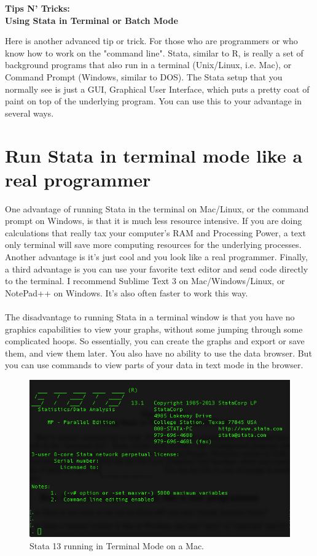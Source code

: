 \documentclass[11pt]{article}
\begin{document}
\thispagestyle{empty}
\pagestyle{plain}
%
\begin{center}
{\bf Tips N' Tricks: \\ 
Using Stata in Terminal or Batch Mode}
\end{center}

\noindent Here is another advanced tip or trick. For those who are programmers or who know how to work on the "command line". Stata, similar to R, is really a set of background programs that also run in a terminal (Unix/Linux, i.e. Mac), or Command Prompt (Windows, similar to DOS). The Stata setup that you normally see is just a GUI, Graphical User Interface, which puts a pretty coat of paint on top of the underlying program. You can use this to your advantage in several ways.

\section{Run Stata in terminal mode like a real programmer}

\noindent One advantage of running Stata in the terminal on Mac/Linux, or the command prompt on Windows, is that it is much less resource intensive. If you are doing calculations that really tax your computer's RAM and Processing Power, a text only terminal will save more computing resources for the underlying processes. Another advantage is it's just cool and you look like a real programmer. Finally, a third advantage is you can use your favorite text editor and send code directly to the terminal. I recommend Sublime Text 3 on Mac/Windows/Linux, or NotePad++ on Windows. It's also often faster to work this way. \\
\\
\noindent The disadvantage to running Stata in a terminal window is that you have no graphics capabilities to view your graphs, without some jumping through some complicated hoops. So essentially, you can create the graphs and export or save them, and view them later. You also have no ability to use the data browser. But you can use commands to view parts of your data in text mode in the browser.

\begin{figure}[htbp]
\begin{center}
 \includegraphics[clip=true,width=.5\textwidth,keepaspectratio]{stataterminal.png}
\caption{Stata 13 running in Terminal Mode on a Mac.}
\label{default}
\end{center}
\end{figure}
\end{document}
